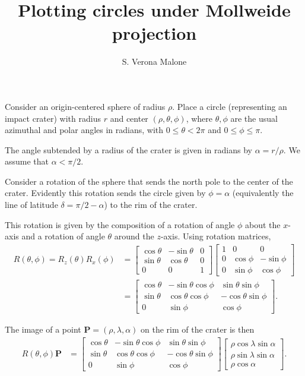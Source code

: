 \documentclass{amsart}
\title{Plotting circles under Mollweide projection}
\author{S. Verona Malone}
\begin{document}
\maketitle

Consider an origin-centered sphere of radius \(\rho\). Place a circle (representing an impact crater) with radius \(r\) and center \((\rho, \theta, \phi)\), where \(\theta, \phi\) are the usual azimuthal and polar angles in radians, with \(0 \leq \theta < 2\pi\) and \(0 \leq \phi \leq \pi\).

The angle subtended by a radius of the crater is given in radians by \(\alpha = r/\rho\). We assume that \(\alpha < \pi/2\).

Consider a rotation of the sphere that sends the north pole to the center of the crater. Evidently this rotation sends the circle given by \(\phi = \alpha\) (equivalently the line of latitude \(\delta = \pi/2 - \alpha\)) to the rim of the crater.

This rotation is given by the composition of a rotation of angle \(\phi\) about the \(x\)-axis and a rotation of angle \(\theta\) around the \(z\)-axis. Using rotation matrices,
\begin{align*}
  R(\theta, \phi) = R_z(\theta)R_x(\phi) &= \begin{bmatrix}\cos \theta & -\sin \theta & 0 \\ \sin \theta & \cos \theta & 0 \\ 0 & 0 & 1 \end{bmatrix}\begin{bmatrix}1 & 0 & 0 \\ 0 & \cos \phi & -\sin \phi \\ 0 & \sin \phi & \cos \phi\end{bmatrix} \\
    &= \begin{bmatrix}\cos \theta & -\sin \theta \cos \phi & \sin \theta \sin \phi \\ \sin \theta & \cos \theta \cos \phi & -\cos \theta \sin \phi \\ 0 & \sin \phi & \cos \phi\end{bmatrix}.
\end{align*}

The image of a point \(\mathbf P = (\rho, \lambda, \alpha)\) on the rim of the crater is then
\begin{align*}
  R(\theta, \phi)\mathbf P &= \begin{bmatrix}\cos \theta & -\sin\theta \cos\phi & \sin\theta\sin\phi \\ \sin \theta & \cos\theta\cos\phi & -\cos\theta\sin\phi \\ 0 & \sin\phi & \cos\phi\end{bmatrix} \begin{bmatrix}\rho \cos \lambda \sin \alpha \\ \rho \sin \lambda \sin \alpha \\ \rho \cos \alpha\end{bmatrix}.
\end{align*}
\end{document}
